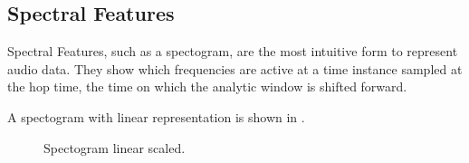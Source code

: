 \subsection{Spectral Features}
Spectral Features, such as a spectogram, are the most intuitive form to represent audio data. 
They show which frequencies are active at a time instance sampled at the hop time, the time on which the analytic window is shifted forward.

A spectogram with linear representation is shown in .

\begin{figure}[!ht]
  \centering
  \caption{Spectogram linear scaled.}
  \label{fig:spec-lin}
\end{figure}
\FloatBarrier
\noindent

